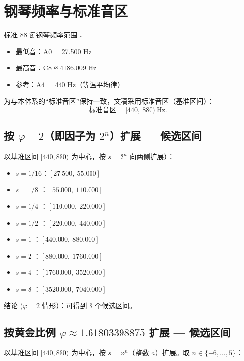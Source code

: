 \documentclass{article}
\begin{document}
\section{钢琴频率与标准音区}
标准 88 键钢琴频率范围：
\begin{itemize}
  \item 最低音：A0 = 27.500 Hz
  \item 最高音：C8 ≈ 4186.009 Hz
  \item 参考：A4 = 440 Hz（等温平均律）
\end{itemize}

为与本体系的“标准音区”保持一致，文稿采用标准音区（基准区间）：
\[
\text{标准音区} = [440,\ 880)\ \text{Hz}.
\]

\subsection{按 \(\varphi=2\)（即因子为 \(2^{n}\)）扩展 — 候选区间}
以基准区间 $[440,880)$ 为中心，按 $s=2^{n}$ 向两侧扩展）：

\begin{itemize}
  \item $s=1/16$：$[27.500,\ 55.000]$
  \item $s=1/8$ ：$[55.000,\ 110.000]$
  \item $s=1/4$ ：$[110.000,\ 220.000]$
  \item $s=1/2$ ：$[220.000,\ 440.000]$
  \item $s=1$   ：$[440.000,\ 880.000]$
  \item $s=2$   ：$[880.000,\ 1760.000]$
  \item $s=4$   ：$[1760.000,\ 3520.000]$
  \item $s=8$   ：$[3520.000,\ 7040.000]$
\end{itemize}

结论 ($\varphi=2$ 情形）：可得到 8 个候选区间。

\subsection{按黄金比例 \(\varphi\approx1.61803398875\) 扩展 — 候选区间}
以基准区间 $[440,880)$ 为中心，按 $s=\varphi^{n}$（整数 $n$）扩展。取 $n\in\{-6,\dots,5\}$：
\end{document}
